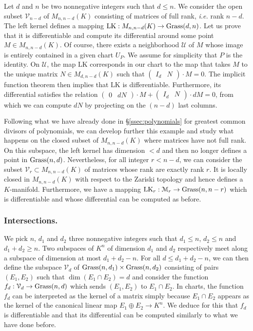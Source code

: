 \documentclass{lms}
\begin{document}
Let $d$ and $n$ be two nonnegative integers such that $d \leq n$.
We consider the open subset $\mathcal V_{n-d}$ of $M_{n,n-d}(K)$ 
consisting of matrices of full rank, \emph{i.e.} rank $n-d$. The left 
kernel defines a mapping $\text{LK} : M_{n,n-d}(K) \to \text{\rm Grass}(d,n)$. Let 
us prove that it is differentiable and compute its differential around 
some point $M \in M_{n,n-d}(K)$. Of course, there exists a neighborhood 
$\mathcal U$ of $M$ whose image is entirely contained in a given chart 
$U_P$. We assume for simplicity that $P$ is the identity. On $\mathcal 
U$, the map $\text{LK}$ corresponds in our chart to the map that 
takes $M$ to the unique matrix $N \in M_{d, n-d}(K)$ such that 
$\begin{pmatrix} I_d & N \end{pmatrix} \cdot M = 0$. The implicit 
function theorem then implies that $\text{LK}$ is differentiable. 
Furthermore, its differential satisfies the relation
$\begin{pmatrix} 0 & dN \end{pmatrix} \cdot M +
\begin{pmatrix} I_d & N \end{pmatrix} \cdot dM = 0$,
from which we can compute $dN$ by projecting on the $(n-d)$ last
columns.

Following what we have already done in \S \ref{ssec:polynomials} for 
greatest common divisors of polynomials, we can develop further this 
example and study what happens on the closed subset of $M_{n,n-d}(K)$ 
where matrices have not full rank. On this subspace, the left kernel has 
dimension $< d$ and then no longer defines a point in $\text{\rm Grass}(n,d)$. 
Nevertheless, for all integer $r < n-d$, we can consider the subset 
$\mathcal V_r \subset M_{n,n-d}(K)$ of matrices whose rank are exactly 
rank $r$. It is locally closed in $M_{n,n-d}(K)$ with respect to the 
Zariski topology and hence defines a $K$-manifold. Furthermore, we have a 
mapping $\text{LK}_r : \mathcal M_r \to \Grass(n,n-r)$ which is 
differentiable and whose differential can be computed as before.

\subsubsection*{Intersections.}

We pick $n$, $d_1$ and 
$d_2$ three nonnegative integers such that $d_1 \leq n$, $d_2 \leq n$ 
and $d_1 + d_2 \geq n$. Two subspaces of $K^n$ of dimension $d_1$ and 
$d_2$ respectively meet along a subspace of dimension at most $d_1 + d_2 
- n$. For all $d \leq d_1 + d_2 -n$, we can then define the subspace 
$\mathcal V_d$ of $\text{\rm Grass}(n,d_1) \times \text{\rm Grass}(n,d_2)$ consisting of 
pairs $(E_1, E_2)$ such that $\dim (E_1 \cap E_2) = d$ and consider the 
function $f_d : \mathcal V_d \to \Grass(n, d)$ which sends $(E_1, E_2)$ 
to $E_1 \cap E_2$. In charts, the function $f_d$ can be interpreted as
the kernel of a matrix simply because $E_1 \cap E_2$ appears as the
kernel of the canonical linear map $E_1 \oplus E_2 \to K^n$. We deduce
for this that $f_d$ is differentiable and that its differential can be
computed similarly to what we have done before.
\end{document}
